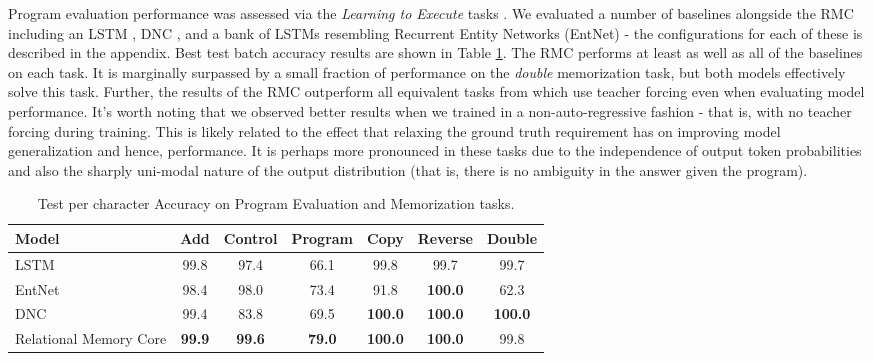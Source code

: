 \documentclass{article}
\begin{document}
Program evaluation performance was assessed via the \textit{Learning to Execute} tasks \cite{zaremba2014lte}. We evaluated a number of baselines alongside the RMC including an LSTM \cite{hochreiter1998lstm, pascanu2013dlstm}, DNC \cite{graves2016hybrid}, and a bank of LSTMs resembling Recurrent Entity Networks \cite{henaff2017entnet} (EntNet) - the configurations for each of these is described in the appendix.  Best test batch accuracy results are shown in Table \ref{tab:lte}. The RMC performs at least as well as all of the baselines on each task. It is marginally surpassed by a small fraction of performance on the \textit{double} memorization task, but both models effectively solve this task. Further, the results of the RMC outperform all equivalent tasks from \cite{zaremba2014lte} which use teacher forcing even when evaluating model performance. It's worth noting that we observed better results when we trained in a non-auto-regressive fashion - that is, with no teacher forcing during training. This is likely related to the effect that relaxing the ground truth requirement has on improving model generalization \cite{sbengio2015schedsamp} and hence, performance. It is perhaps more pronounced in these tasks due to the independence of output token probabilities and also the sharply uni-modal nature of the output distribution (that is, there is no ambiguity in the answer given the program).

\begin{table}[h!]
    \centering
    \caption{Test per character Accuracy on Program Evaluation and Memorization tasks. }
    \begin{tabular}{l c c c c c c}
    \toprule
    \textbf{Model} & Add & Control & Program & Copy & Reverse & Double \\
    \midrule
    LSTM \cite{hochreiter1998lstm, pascanu2013dlstm} & 99.8 & 97.4 & 66.1 & 99.8 & 99.7 & 99.7 \\
    EntNet \cite{henaff2017entnet} & 98.4 & 98.0 & 73.4 & 91.8 & \textbf{100.0} & 62.3 \\
    DNC \cite{graves2016hybrid} & 99.4 & 83.8 & 69.5 & \textbf{100.0} & \textbf{100.0} & \textbf{100.0}  \\ 

    \midrule
    Relational Memory Core & \textbf{99.9} & \textbf{99.6} & \textbf{79.0} & \textbf{100.0} & \textbf{100.0} & 99.8 \\
    \bottomrule
    \end{tabular}
    \label{tab:lte}
\end{table}
\end{document}
